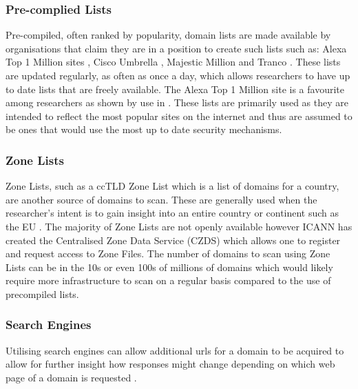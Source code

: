 \documentclass{mscreport}
\begin{document}
\subsubsection{Pre-complied Lists}

Pre-compiled, often ranked by popularity, domain lists are made available by organisations that claim they are in a position to create such lists such as: Alexa Top 1 Million sites \cite{noauthor_undated-wh}, Cisco Umbrella \cite{noauthor_undated-ku}, Majestic Million \cite{noauthor_undated-sz} and Tranco \cite{noauthor_undated-mt}. These lists are updated regularly, as often as once a day, which allows researchers to have up to date lists that are freely available. The Alexa Top 1 Million site is a favourite among researchers as shown by use in \cite{Buchanan2018-xz,Chen2016-dl,Kumar2017-qw,Patil2017-bg,Ying2016-ag,Michael2015-hn,Van_Goethem2014-ao,Holz2020-ha,Poteat2021-zr}. These lists are primarily used as they are intended to reflect the most popular sites on the internet and thus are assumed to be ones that would use the most up to date security mechanisms.

\subsubsection{Zone Lists}

Zone Lists, such as a ccTLD Zone List which is a list of domains for a country, are another source of domains to scan. These are generally used when the researcher’s intent is to gain insight into an entire country or continent such as the EU \cite{Amann2017-co,Chen2016-dl,Van_Goethem2014-ao,Holz2020-ha}. The majority of Zone Lists are not openly available however ICANN has created the Centralised Zone Data Service (CZDS) \cite{noauthor_undated-mm} which allows one to register and request access to Zone Files. The number of domains to scan using Zone Lists can be in the 10s or even 100s of millions of domains which would likely require more infrastructure to scan on a regular basis compared to the use of precompiled lists.

\subsubsection{Search Engines}

Utilising search engines can allow additional urls for a domain to be acquired to allow for further insight how responses might change depending on which web page of a domain is requested \cite{Chen2016-dl}.
\end{document}
